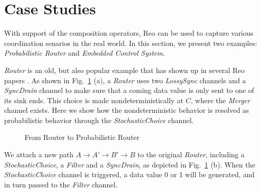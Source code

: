 \section{Case Studies}
\label{sec:casestudies}


With support of the composition operators, Reo can be used to capture various coordination senarios in the real world. In this section, we present two examples: \emph{Probabilistic Router} and \emph{Embedded Control System}.


\begin{example}
\emph{Router} is an old, but also popular example that has shown up in several Reo papers \cite{Baier2006a,Arbab2006}. As shown in Fig.~\ref{fig:router} (a), a \emph{Router} uses two \emph{LossySync} channels and a \emph{SyncDrain} channel to make sure that a coming data value is only sent to one of its sink ends. This choice is made nondeterministically at $C$, where the \emph{Merger} channel exists. Here we show how the nondeterministic behavior is resolved as probabilistic behavior through the \emph{StochasticChoice} channel.


\begin{figure}[H]
    \centering
    
    \caption{From Router to Probabilistic Router}
    \label{fig:router}
\end{figure}

We attach a new path $A\rightarrow A'\rightarrow B'\rightarrow B$ to the original \emph{Router}, including a \emph{StochasticChoice}, a \emph{Filter} and a \emph{SyncDrain}, as depicted in Fig.~\ref{fig:router} (b).
When the \emph{StochasticChoice} channel is triggered, a data value 0 or 1 will be generated, and in turn passed to the \emph{Filter} channel. 



\end{example}
